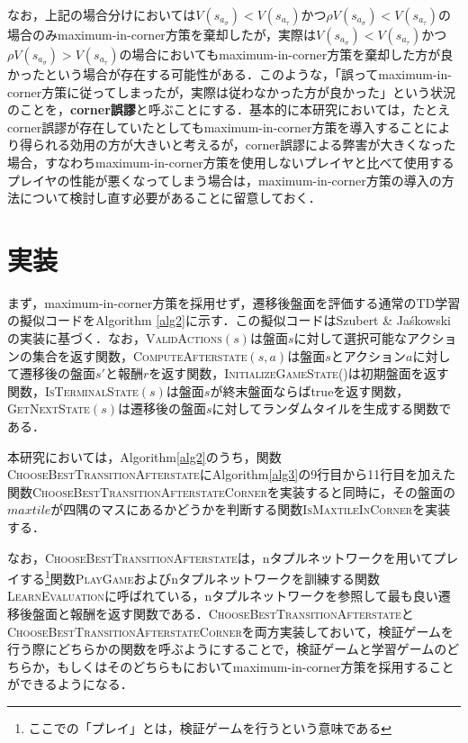 \documentclass{suribt}
\begin{document}
なお，上記の場合分けにおいては$V(s_{a_{\sigma}}) < V(s_{a_{\tau}})$かつ${\rho}V(s_{a_{\sigma}}) < V(s_{a_{\tau}})$の場合のみmaximum-in-corner方策を棄却したが，実際は$V(s_{a_{\sigma}}) < V(s_{a_{\tau}})$かつ${\rho}V(s_{a_{\sigma}}) > V(s_{a_{\tau}})$の場合においてもmaximum-in-corner方策を棄却した方が良かったという場合が存在する可能性がある．このような，「誤ってmaximum-in-corner方策に従ってしまったが，実際は従わなかった方が良かった」という状況のことを，\textbf{corner誤謬}と呼ぶことにする．基本的に本研究においては，たとえcorner誤謬が存在していたとしてもmaximum-in-corner方策を導入することにより得られる効用の方が大きいと考えるが，corner誤謬による弊害が大きくなった場合，すなわちmaximum-in-corner方策を使用しないプレイヤと比べて使用するプレイヤの性能が悪くなってしまう場合は，maximum-in-corner方策の導入の方法について検討し直す必要があることに留意しておく．

\section{実装}
まず，maximum-in-corner方策を採用せず，遷移後盤面を評価する通常のTD学習の擬似コードをAlgorithm \ref{alg2}に示す．この擬似コードはSzubert \& Ja\'{s}kowskiの実装に基づく．なお，\textsc{ValidActions}$(s)$は盤面$s$に対して選択可能なアクションの集合を返す関数，\textsc{ComputeAfterstate}$(s,a)$は盤面$s$とアクション$a$に対して遷移後の盤面$s'$と報酬$r$を返す関数，\textsc{InitializeGameState()}は初期盤面を返す関数，\textsc{IsTerminalState}$(s)$は盤面$s$が終末盤面ならばtrueを返す関数，\textsc{GetNextState}$(s)$は遷移後の盤面$s$に対してランダムタイルを生成する関数である．

本研究においては，Algorithm\ref{alg2}のうち，関数\textsc{ChooseBestTransitionAfterstate}にAlgorithm\ref{alg3}の9行目から11行目を加えた関数\textsc{ChooseBestTransitionAfterstateCorner}を実装すると同時に，その盤面の$maxtile$が四隅のマスにあるかどうかを判断する関数\textsc{IsMaxtileInCorner}を実装する．

なお，\textsc{ChooseBestTransitionAfterstate}は，nタプルネットワークを用いてプレイする\footnote{ここでの「プレイ」とは，検証ゲームを行うという意味である}関数\textsc{PlayGame}およびnタプルネットワークを訓練する関数\textsc{LearnEvaluation}に呼ばれている，nタプルネットワークを参照して最も良い遷移後盤面と報酬を返す関数である．\textsc{ChooseBestTransitionAfterstate}と\textsc{ChooseBestTransitionAfterstateCorner}を両方実装しておいて，検証ゲームを行う際にどちらかの関数を呼ぶようにすることで，検証ゲームと学習ゲームのどちらか，もしくはそのどちらもにおいてmaximum-in-corner方策を採用することができるようになる．
\end{document}
